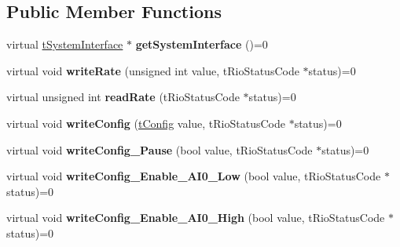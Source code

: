 \subsection*{Public Member Functions}
\begin{DoxyCompactItemize}
\item 
\hypertarget{classnFPGA_1_1nFRC__2012__1__6__4_1_1tDMA_a96c02580fc31bd469edee25d782bff8a}{
virtual \hyperlink{classnFPGA_1_1tSystemInterface}{tSystemInterface} $\ast$ {\bfseries getSystemInterface} ()=0}
\label{classnFPGA_1_1nFRC__2012__1__6__4_1_1tDMA_a96c02580fc31bd469edee25d782bff8a}

\item 
\hypertarget{classnFPGA_1_1nFRC__2012__1__6__4_1_1tDMA_a4ceb74e616283dd66933c59e9f086cff}{
virtual void {\bfseries writeRate} (unsigned int value, tRioStatusCode $\ast$status)=0}
\label{classnFPGA_1_1nFRC__2012__1__6__4_1_1tDMA_a4ceb74e616283dd66933c59e9f086cff}

\item 
\hypertarget{classnFPGA_1_1nFRC__2012__1__6__4_1_1tDMA_a254a0ec9a51c99acbee524cdc4cf1f34}{
virtual unsigned int {\bfseries readRate} (tRioStatusCode $\ast$status)=0}
\label{classnFPGA_1_1nFRC__2012__1__6__4_1_1tDMA_a254a0ec9a51c99acbee524cdc4cf1f34}

\item 
\hypertarget{classnFPGA_1_1nFRC__2012__1__6__4_1_1tDMA_ac0df5c05f70062b95d65ada702db34b7}{
virtual void {\bfseries writeConfig} (\hyperlink{unionnFPGA_1_1nFRC__2012__1__6__4_1_1tDMA_1_1tConfig}{tConfig} value, tRioStatusCode $\ast$status)=0}
\label{classnFPGA_1_1nFRC__2012__1__6__4_1_1tDMA_ac0df5c05f70062b95d65ada702db34b7}

\item 
\hypertarget{classnFPGA_1_1nFRC__2012__1__6__4_1_1tDMA_a13327c4ce80fb65868c5649192eb3b08}{
virtual void {\bfseries writeConfig\_\-Pause} (bool value, tRioStatusCode $\ast$status)=0}
\label{classnFPGA_1_1nFRC__2012__1__6__4_1_1tDMA_a13327c4ce80fb65868c5649192eb3b08}

\item 
\hypertarget{classnFPGA_1_1nFRC__2012__1__6__4_1_1tDMA_ab40d2d4b47f5d4ad7b1d3f10771d5393}{
virtual void {\bfseries writeConfig\_\-Enable\_\-AI0\_\-Low} (bool value, tRioStatusCode $\ast$status)=0}
\label{classnFPGA_1_1nFRC__2012__1__6__4_1_1tDMA_ab40d2d4b47f5d4ad7b1d3f10771d5393}

\item 
\hypertarget{classnFPGA_1_1nFRC__2012__1__6__4_1_1tDMA_a5033b18e29fc71eba7433370f9f33dad}{
virtual void {\bfseries writeConfig\_\-Enable\_\-AI0\_\-High} (bool value, tRioStatusCode $\ast$status)=0}
\label{classnFPGA_1_1nFRC__2012__1__6__4_1_1tDMA_a5033b18e29fc71eba7433370f9f33dad}


\end{DoxyCompactItemize}
